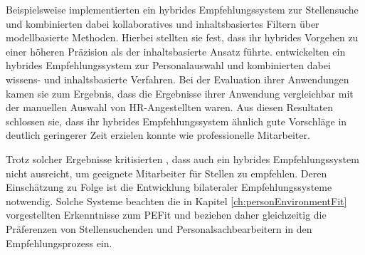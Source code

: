 Beispielsweise implementierten \textcite[S. 1ff.]{combiningCbAndCFCostSensitiveApproach:2017} ein hybrides Empfehlungssystem zur Stellensuche und kombinierten dabei kollaboratives und inhaltsbasiertes Filtern über modellbasierte Methoden. Hierbei stellten sie fest, dass ihr hybrides Vorgehen zu einer höheren Präzision als der inhaltsbasierte Ansatz führte. \textcite[S. 1ff.]{mohamed:2018} entwickelten ein hybrides Empfehlungssystem zur Personalauswahl und kombinierten dabei wissens- und inhaltsbasierte Verfahren. Bei der Evaluation ihrer Anwendungen kamen sie zum Ergebnis, dass die Ergebnisse ihrer Anwendung vergleichbar mit der manuellen Auswahl von HR-Angestellten waren. Aus diesen Resultaten schlossen sie, dass ihr hybrides Empfehlungssystem ähnlich gute Vorschläge in deutlich geringerer Zeit erzielen konnte wie professionelle Mitarbeiter.

Trotz solcher Ergebnisse kritisierten \textcite[S. 1ff.]{malinowski:2006}, dass auch ein hybrides Empfehlungssystem nicht ausreicht, um geeignete Mitarbeiter für Stellen zu empfehlen. Deren Einschätzung zu Folge ist die Entwicklung bilateraler Empfehlungssysteme notwendig. Solche Systeme beachten die in Kapitel \ref{ch:personEnvironmentFit} vorgestellten Erkenntnisse zum \ac{PEFit} und beziehen daher gleichzeitig die Präferenzen von Stellensuchenden und Personalsachbearbeitern in den Empfehlungsprozess ein.
